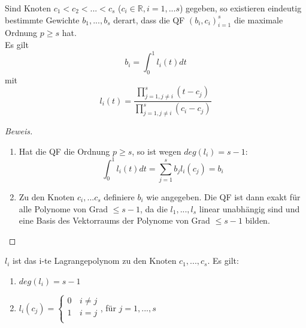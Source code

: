 \begin{theorem}
Sind Knoten $c_1 < c_2 < ... < c_s$ ($c_i \in \mathbb{R}, i = 1,...s$) gegeben, so existieren eindeutig bestimmte Gewichte $b_1 ,..., b_s$ derart, dass die QF $(b_i, c_i)_{i=1}^s$ die maximale Ordnung $p \geq s$ hat. \\
Es gilt $$b_i = \int_0^1 l_i(t) dt$$ mit $$l_i(t) = \frac{\prod_{j=1, j\neq i}^s (t-c_j)}{\prod_{j=1, j\neq i}^s (c_i-c_j)}$$

\begin{proof}[Beweis]\leavevmode
\begin{enumerate}
  \item Hat die QF die Ordnung $p \geq s$, so ist wegen $deg(l_i) = s-1$:
  $$ \int_0^1 l_i(t) dt = \sum_{j=1}^s b_j l_i(c_j) = b_i$$
  \item Zu den Knoten $c_i, ...c_s$ definiere $b_i$ wie angegeben. Die QF ist dann exakt für alle Polynome von Grad $ \leq s-1$, da die $l_1, ...,l_s$ linear unabhängig sind und eine Basis des Vektorraums der Polynome von Grad $\leq s-1$ bilden.
\end{enumerate}
\end{proof}
\end{theorem}

\begin{comment*}[zu Satz (2.8)]
$l_i$ ist das i-te Lagrangepolynom zu den Knoten $c_1, ...,c_s$. Es gilt:
\begin{enumerate}
  \item $deg(l_i) = s-1$
  \item $l_i(c_j) = \left\{
\begin{array}{ll}
0 & \,i \neq j \\
1 & \, i = j\\
\end{array}
\right. $, für $j=1,...,s$
\end{enumerate}

\end{comment*}
